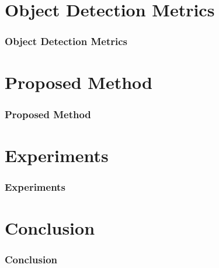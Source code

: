 \documentclass{beamer}
\begin{document}
\section{Object Detection Metrics}
\begin{frame}
  \frametitle{Object Detection Metrics}
\end{frame}

\section{Proposed Method}
\begin{frame}
  \frametitle{Proposed Method}
\end{frame}

\section{Experiments}
\begin{frame}
  \frametitle{Experiments}
\end{frame}

\section{Conclusion}
\begin{frame}
  \frametitle{Conclusion}
\end{frame}
\end{document}
